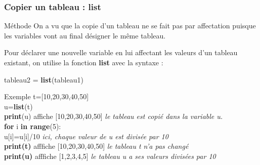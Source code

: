\documentclass[9pt]{beamer}
\begin{document}
\begin{frame}
\frametitle{Copier un tableau : \textbf{list}}

\begin{block}{Méthode}
On a vu que la copie d'un tableau ne se fait pas par affectation puisque les variables vont au final désigner le même tableau.

Pour déclarer une nouvelle variable en lui affectant les valeurs d'un tableau existant, on utilise la fonction \textbf{list} avec la syntaxe :

tableau2 = \textbf{list}(tableau1)

\end{block}

\begin{exampleblock}{Exemple}
t=[10,20,30,40,50] \\
u=\textbf{list}(t)\\
\textbf{print}(u) affiche [10,20,30,40,50]  \hspace{1cm}  \textit{le tableau est copié dans la variable u.}\\
\textbf{for} i \textbf{in range}(5):\\
\hspace{0.5cm}u[i]=u[i]/10  \hspace{1cm}  \textit{ici, chaque valeur de u est divisée par 10}\\
\textbf{print(t)} afffiche [10,20,30,40,50]  \hspace{1cm} \textit{ le tableau t n'a pas changé}\\
\textbf{print(u)} afffiche [1,2,3,4,5]  \hspace{1cm} \textit{ le tableau u a ses valeurs divisées par 10}
\end{exampleblock}

\end{frame}
\end{document}
